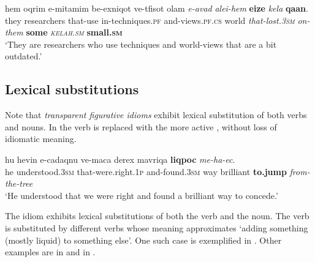 \documentclass[output=paper]{langsci/langscibook}
\begin{document}
    \ea\label{she:kelax-ins-int-mod-quant}
        \gll hem {\het}oqrim {\shin}e-mi{\shin}tam{\shin}im be-{\tet}exniqot ve-tfisot {\ayin}olam \textit{{\shin}e-{\alef}avad} \textit{{\ayin}alei-hem} \textbf{{\alef}eize} \textit{kela{\het}} \textbf{qa{\tetB}an}.\\
            they researchers that-use in-techniques.\textsc{pf} and-views.\textsc{pf.cs} world \textit{that-lost.\textsc{3sm}} \textit{on-them} \textbf{some} \textit{\textsc{kelah}.\textsc{sm}} \textbf{small.\textsc{sm}}\\
        \glt `They are researchers who use techniques and world-views that are a bit outdated.'
    \z



\subsection{Lexical substitutions}
\label{she:sec:ls}

Note that \textit{transparent figurative idioms} exhibit lexical substitution of both verbs and nouns. In  the verb  is replaced with the more active , without loss of idiomatic meaning.

    \ea\label{she:ec-sub-verb}
        \gll hu hevin {\shin}e-cadaqnu ve-maca derex mavriqa \textbf{liqpoc} \textit{me-ha-{\ayin}ec}.\\
            he understood.\textsc{3sm} that-were.right.\textsc{1p} and-found.\textsc{3sm} way brilliant \textbf{to.jump} \textit{from-the-tree}\\
        \glt `He understood that we were right and found a brilliant way to concede.'
    \z

The idiom  exhibits lexical substitutions of both the verb and the noun. The verb  is substituted by different verbs whose meaning approximates `adding something (mostly liquid) to something else'. One such case is exemplified in . Other examples are  in  and  in .
\end{document}
